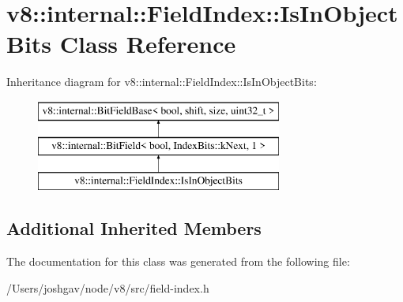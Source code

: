 \hypertarget{classv8_1_1internal_1_1_field_index_1_1_is_in_object_bits}{}\section{v8\+:\+:internal\+:\+:Field\+Index\+:\+:Is\+In\+Object\+Bits Class Reference}
\label{classv8_1_1internal_1_1_field_index_1_1_is_in_object_bits}
Inheritance diagram for v8\+:\+:internal\+:\+:Field\+Index\+:\+:Is\+In\+Object\+Bits\+:\begin{figure}[H]
\begin{center}
\leavevmode
\includegraphics[height=3.000000cm]{classv8_1_1internal_1_1_field_index_1_1_is_in_object_bits}
\end{center}
\end{figure}
\subsection*{Additional Inherited Members}


The documentation for this class was generated from the following file\+:\begin{DoxyCompactItemize}
\item 
/\+Users/joshgav/node/v8/src/field-\/index.\+h\end{DoxyCompactItemize}

